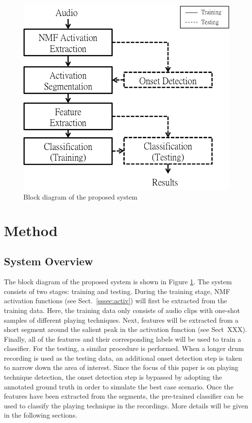 \documentclass{article}
\begin{document}

\begin{figure}
\centering
\includegraphics[width = 7 cm]{./figures/block_diagram.png}
\caption{Block diagram of the proposed system}
\label{fig:block}
\end{figure}

\section{Method}\label{sec:method}
\subsection{System Overview}\label{ssec:overview}

The block diagram of the proposed system is shown in Figure \ref{fig:block}. The system consists of two stages: training and testing. During the training stage, NMF {\color{red}{already introduced?}} activation functions (see Sect.~\ref{sssec:activ}) will first be extracted from the training data. Here, the training data only consists of audio clips with one-shot samples of different playing techniques. Next, features will be extracted from a short segment around the salient peak in the activation function (see Sect\.~XXX). Finally, all of the features and their corresponding labels will be used to train a classifier. {\color{red}{introduce the classes here}} For the testing, a similar procedure is performed. When a longer drum recording is used as the testing data, an additional onset detection step is taken to narrow down the area of interest. {\color{red}{the following sentence maybe later --- not really system overview}} Since the focus of this paper is on playing technique detection, the onset detection step is bypassed by adopting the annotated ground truth in order to simulate the best case scenario. Once the features have been extracted from the segments, the pre-trained classifier can be used to classify the playing technique in the recordings. More details will be given in the following sections. 
 
\end{document}
